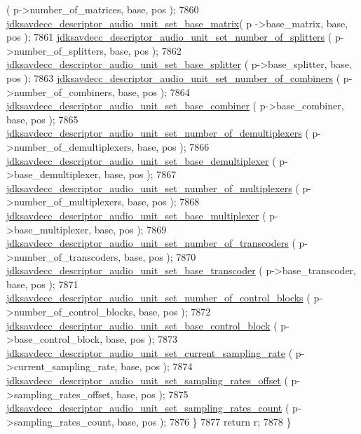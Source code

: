 \begin{DoxyCode}
      ( p->number\_of\_matrices, base, pos );
7860         \hyperlink{group__descriptor__audio_ga60f7aaff33ba1362ce55688a1be1abaf}{jdksavdecc\_descriptor\_audio\_unit\_set\_base\_matrix}( p
      ->base\_matrix, base, pos );
7861         \hyperlink{group__descriptor__audio_ga8b907db7fd0b69cfd799e0b88214cd70}{jdksavdecc\_descriptor\_audio\_unit\_set\_number\_of\_splitters}
      ( p->number\_of\_splitters, base, pos );
7862         \hyperlink{group__descriptor__audio_ga76e946c323bfd0e672146d4fd49dd7f9}{jdksavdecc\_descriptor\_audio\_unit\_set\_base\_splitter}
      ( p->base\_splitter, base, pos );
7863         \hyperlink{group__descriptor__audio_ga82603890c6e4a62f5c6b9b9fcd3a5fd5}{jdksavdecc\_descriptor\_audio\_unit\_set\_number\_of\_combiners}
      ( p->number\_of\_combiners, base, pos );
7864         \hyperlink{group__descriptor__audio_ga6b858707c0a7588c322db0e8dd8e6855}{jdksavdecc\_descriptor\_audio\_unit\_set\_base\_combiner}
      ( p->base\_combiner, base, pos );
7865         \hyperlink{group__descriptor__audio_gacdb038d8b3375ff4d4e9e8ec9124fbe9}{jdksavdecc\_descriptor\_audio\_unit\_set\_number\_of\_demultiplexers}
      ( p->number\_of\_demultiplexers, base, pos );
7866         \hyperlink{group__descriptor__audio_ga4f5b8dbebba11a4447c11c1dd8344236}{jdksavdecc\_descriptor\_audio\_unit\_set\_base\_demultiplexer}
      ( p->base\_demultiplexer, base, pos );
7867         \hyperlink{group__descriptor__audio_ga596b59bc373ec55738ee63c83b6164b2}{jdksavdecc\_descriptor\_audio\_unit\_set\_number\_of\_multiplexers}
      ( p->number\_of\_multiplexers, base, pos );
7868         \hyperlink{group__descriptor__audio_gad1bc05f36654ecedd71223a499204aa7}{jdksavdecc\_descriptor\_audio\_unit\_set\_base\_multiplexer}
      ( p->base\_multiplexer, base, pos );
7869         \hyperlink{group__descriptor__audio_gaa0b8f99a4ffb2e6b3c458c0777083ae3}{jdksavdecc\_descriptor\_audio\_unit\_set\_number\_of\_transcoders}
      ( p->number\_of\_transcoders, base, pos );
7870         \hyperlink{group__descriptor__audio_ga84ea8577e0b944b9fb401f49047bb78c}{jdksavdecc\_descriptor\_audio\_unit\_set\_base\_transcoder}
      ( p->base\_transcoder, base, pos );
7871         \hyperlink{group__descriptor__audio_ga30fce7f32ad24820647a671371b4bf2a}{jdksavdecc\_descriptor\_audio\_unit\_set\_number\_of\_control\_blocks}
      ( p->number\_of\_control\_blocks, base, pos );
7872         \hyperlink{group__descriptor__audio_gaf655be770dbc6acc56c3605f544148b9}{jdksavdecc\_descriptor\_audio\_unit\_set\_base\_control\_block}
      ( p->base\_control\_block, base, pos );
7873         \hyperlink{group__descriptor__audio_gaa80221c15885669f38f552b9acb2c59f}{jdksavdecc\_descriptor\_audio\_unit\_set\_current\_sampling\_rate}
      ( p->current\_sampling\_rate, base, pos );
7874         \hyperlink{group__descriptor__audio_gaa43383a00cc8393ab73a1599da6d8a49}{jdksavdecc\_descriptor\_audio\_unit\_set\_sampling\_rates\_offset}
      ( p->sampling\_rates\_offset, base, pos );
7875         \hyperlink{group__descriptor__audio_ga27c6f1a8821f3737d07de58987227f6f}{jdksavdecc\_descriptor\_audio\_unit\_set\_sampling\_rates\_count}
      ( p->sampling\_rates\_count, base, pos );
7876     \}
7877     \textcolor{keywordflow}{return} r;
7878 \}
\end{DoxyCode}


